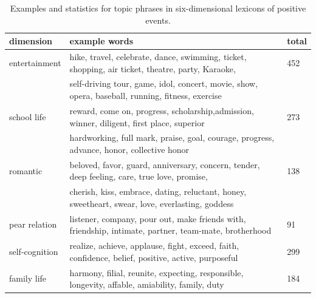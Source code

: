\begin{table}
\centering
\caption{\small{Examples and statistics for topic phrases in six-dimensional lexicons of positive events.}}
\label{tab:topicWords}
\small{
\begin{tabular}{lll}
\toprule
dimension & example words & total \\ \midrule
entertainment  & hike, travel, celebrate, dance, swimming, ticket, shopping, air ticket, theatre, party, Karaoke,& 452\\
                      & self-driving tour, game, idol, concert, movie, show, opera, baseball, running, fitness, exercise & \\
school life    & reward, come on, progress, scholarship,admission, winner, diligent, first place, superior & 273\\
				      & hardworking, full mark,  praise, goal, courage, progress, advance, honor, collective honor& \\
romantic       &  beloved, favor, guard, anniversary,  concern, tender, deep feeling, care, true love, promise, & 138\\
				      & cherish, kiss, embrace, dating, reluctant, honey, sweetheart, swear, love, everlasting, goddess &\\
pear relation  & listener, company, pour out, make friends with, friendship, intimate, partner, team-mate, brotherhood& 91\\
self-cognition & realize, achieve, applause, fight, exceed, faith, confidence, belief, positive, active, purposeful & 299\\
family life    & harmony, filial, reunite, expecting, responsible, longevity, affable, amiability, family, duty & 184\\
\bottomrule
\end{tabular}}
\end{table}

